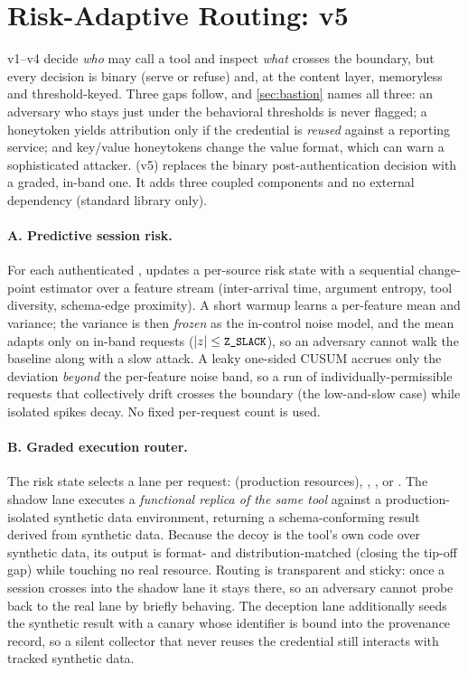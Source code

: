 \section{Risk-Adaptive Routing: \mirage{} v5}\label{sec:mirage}
v1--v4 decide \emph{who} may call a tool and inspect \emph{what} crosses the
boundary, but every decision is binary (serve or refuse) and, at the content
layer, memoryless and threshold-keyed. Three gaps follow, and
\cref{sec:bastion} names all three: an adversary who stays just under the
behavioral thresholds is never flagged; a honeytoken yields attribution only
if the credential is \emph{reused} against a reporting service; and key/value
honeytokens change the value format, which can warn a sophisticated attacker.
\mirage{} (v5) replaces the binary post-authentication decision with a graded,
in-band one. It adds three coupled components and no external dependency
(standard library only).

\paragraph{A. Predictive session risk.}
For each authenticated , \mirage{} updates a per-source risk
state with a sequential change-point estimator over a feature stream
(inter-arrival time, argument entropy, tool diversity, schema-edge proximity).
A short warmup learns a per-feature mean and variance; the variance is then
\emph{frozen} as the in-control noise model, and the mean adapts only on
in-band requests ($|z|\le\texttt{\small Z\_SLACK}$), so an adversary cannot walk the
baseline along with a slow attack. A leaky one-sided CUSUM accrues only the
deviation \emph{beyond} the per-feature noise band, so a run of
individually-permissible requests that collectively drift crosses the boundary
(the low-and-slow case) while isolated spikes decay. No fixed per-request count
is used.

\paragraph{B. Graded execution router.}
The risk state selects a lane per request:  (production
resources), , , or . The shadow
lane executes a \emph{functional replica of the same tool} against a
production-isolated synthetic data environment, returning a schema-conforming
result derived from synthetic data. Because the decoy is the tool's own code
over synthetic data, its output is format- and distribution-matched (closing
the tip-off gap) while touching no real resource. Routing is transparent and
sticky: once a session crosses into the shadow lane it stays there, so an
adversary cannot probe back to the real lane by briefly behaving. The deception
lane additionally seeds the synthetic result with a canary whose identifier is
bound into the provenance record, so a silent collector that never reuses the
credential still interacts with tracked synthetic data.

